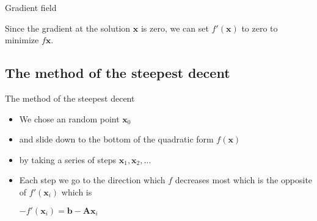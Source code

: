 \documentclass[12pt,t]{beamer}
\begin{document}
\begin{frame}[fragile]{Gradient field}

\vspace{-0.25cm}
\begin{center}
\end{center}
\vspace{-0.25cm}
Since the gradient at the solution $\mathbf{x}$ is zero, we can set $f'(\mathbf{x})$ to zero to minimize $f\mathbf{x}$.

\end{frame}

\subsection{The method of the steepest decent}

\begin{frame}{The method of the steepest decent}

\begin{itemize}
\item We chose an random point $\mathbf{x}_0$
\item and slide down to the bottom of the quadratic form $f(\mathbf{x})$
\item by taking a series of steps $\mathbf{x}_1,\mathbf{x}_2,\ldots$
\item Each step we go to the direction which $f$ decreases most which is the opposite of $f'(\mathbf{x}_i)$ which is
\begin{center}
$-f'(\mathbf{x}_i)= \mathbf{b}-\mathbf{A}\mathbf{x}_i$
\end{center}
\end{itemize}

\end{frame}
\end{document}
